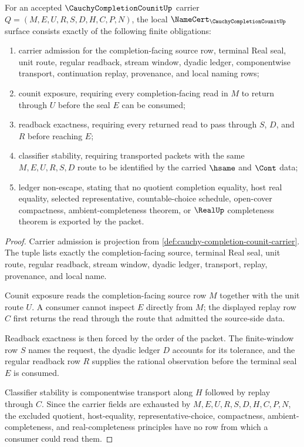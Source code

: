 \begin{theorem}
\label{thm:cauchy-completion-counit-namecert-obligations}
For an accepted $\CauchyCompletionCounitUp$ carrier $Q=(M,E,U,R,S,D,H,C,P,N)$, the local $\NameCert_{\CauchyCompletionCounitUp}$ surface consists exactly of the following finite obligations:
\begin{enumerate}
\item carrier admission for the completion-facing source row, terminal Real seal, unit route, regular readback, stream window, dyadic ledger, componentwise transport, continuation replay, provenance, and local naming rows;
\item counit exposure, requiring every completion-facing read in $M$ to return through $U$ before the seal $E$ can be consumed;
\item readback exactness, requiring every returned read to pass through $S$, $D$, and $R$ before reaching $E$;
\item classifier stability, requiring transported packets with the same $M,E,U,R,S,D$ route to be identified by the carried $\hsame$ and $\Cont$ data;
\item ledger non-escape, stating that no quotient completion equality, host real equality, selected representative, countable-choice schedule, open-cover compactness, ambient-completeness theorem, or $\RealUp$ completeness theorem is exported by the packet.
\end{enumerate}
\end{theorem}
\begin{proof}
Carrier admission is projection from \autoref{def:cauchy-completion-counit-carrier}. The tuple lists exactly the completion-facing source, terminal Real seal, unit route, regular readback, stream window, dyadic ledger, transport, replay, provenance, and local name.

Counit exposure reads the completion-facing source row $M$ together with the unit route $U$. A consumer cannot inspect $E$ directly from $M$; the displayed replay row $C$ first returns the read through the route that admitted the source-side data.

Readback exactness is then forced by the order of the packet. The finite-window row $S$ names the request, the dyadic ledger $D$ accounts for its tolerance, and the regular readback row $R$ supplies the rational observation before the terminal seal $E$ is consumed.

Classifier stability is componentwise transport along $H$ followed by replay through $C$. Since the carrier fields are exhausted by $M,E,U,R,S,D,H,C,P,N$, the excluded quotient, host-equality, representative-choice, compactness, ambient-completeness, and real-completeness principles have no row from which a consumer could read them.
\end{proof}

